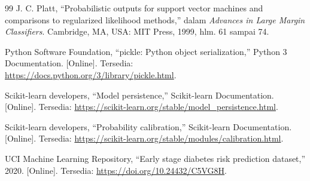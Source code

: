 \documentclass[a4paper,oneside,12pt]{report}
\begin{document}
\begin{thebibliography}{99}
	 J. C. Platt, ``Probabilistic outputs for support vector machines and comparisons to regularized likelihood methods,'' dalam \textit{Advances in Large Margin Classifiers}. Cambridge, MA, USA: MIT Press, 1999, hlm. 61 sampai 74.

	 Python Software Foundation, ``pickle: Python object serialization,'' Python 3 Documentation. [Online]. Tersedia: \url{https://docs.python.org/3/library/pickle.html}.

	 Scikit-learn developers, ``Model persistence,'' Scikit-learn Documentation. [Online]. Tersedia: \url{https://scikit-learn.org/stable/model_persistence.html}.

	 Scikit-learn developers, ``Probability calibration,'' Scikit-learn Documentation. [Online]. Tersedia: \url{https://scikit-learn.org/stable/modules/calibration.html}.

	 UCI Machine Learning Repository, ``Early stage diabetes risk prediction dataset,'' 2020. [Online]. Tersedia: \url{https://doi.org/10.24432/C5VG8H}.
\end{thebibliography}
\end{document}
